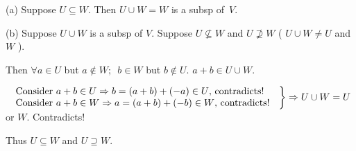 \documentclass[a4paper, 11pt, UTF8]{article}
\def\Hb{{\large\Blind{(b) }}}
\begin{document}
\begin{large}
\par\quad
(a) Suppose $U\subseteq W$. Then $U\cup W=W$ is a subsp of \,$V$.\par\quad
(b) Suppose $U\cup W$ is a subsp of $V$. Suppose $U\not\subseteq W$ and $U\not\supseteq W$ ( $U\cup W\neq U$ and $W$ ).\par\quad\Hb
Then $\forall a\in U$ but $a\not\in W;\,\,\,b\in W$ but $b\not\in U.\,\,a+b\in U\cup W$.\par\vspace{6pt}\qquad
$\MathRightBrace{l}{$
Consider $a+b\in U\Rightarrow b=(a+b)+(-a)\in U$, contradicts!$\\ $
Consider $a+b\in W\Rightarrow a=(a+b)+(-b)\in W$, contradicts!
$}\Rightarrow U\cup W=U$ or $W.$ Contradicts!\par\vspace{6pt}\quad\Hb
Thus $U\subseteq W$ and $U\supseteq W.$\PfEnd
\SepLine


\end{large}
\end{document}
